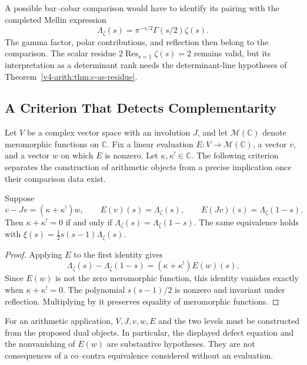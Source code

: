 A possible bar--cobar comparison would have to identify its pairing
with the completed Mellin expression
\[
 \Lambda_\zeta(s)=\pi^{-s/2}\Gamma(s/2)\zeta(s).
\]
The gamma factor, polar contributions, and reflection then belong to
the comparison. The scalar residue
\(2\operatorname{Res}_{s=1}\zeta(s)=2\) remains valid, but its
interpretation as a determinant rank needs the determinant-line
hypotheses of Theorem~\ref{v4-arith:thm:c-as-residue}.

\subsection{A Criterion That Detects Complementarity}

Let \(V\) be a complex vector space with an involution \(J\),
and let \(\mathscr M(\mathbb C)\) denote meromorphic functions on
\(\mathbb C\). Fix a linear evaluation
\(E:V\to\mathscr M(\mathbb C)\), a vector \(v\), and a vector
\(w\) on which \(E\) is nonzero. Let \(\kappa,\kappa^!\in\mathbb C\).
The following criterion separates the construction of arithmetic
objects from a precise implication once their comparison data exist.

\begin{theorem}
\label{v4-arith:thm:P1-resolution}
Suppose
\begin{equation}
 v-Jv=(\kappa+\kappa^!)w,
 \qquad
 E(v)(s)=\Lambda_\zeta(s),
 \qquad
 E(Jv)(s)=\Lambda_\zeta(1-s).
\end{equation}
Then \(\kappa+\kappa^!=0\) if and only if
\(\Lambda_\zeta(s)=\Lambda_\zeta(1-s)\).
The same equivalence holds with
\(\xi(s)=\tfrac12s(s-1)\Lambda_\zeta(s)\).
\end{theorem}
\begin{proof}
Applying \(E\) to the first identity gives
\[
 \Lambda_\zeta(s)-\Lambda_\zeta(1-s)
   =(\kappa+\kappa^!)E(w)(s).
\]
Since \(E(w)\) is not the zero meromorphic function, this identity
vanishes exactly when \(\kappa+\kappa^!=0\). The polynomial
\(s(s-1)/2\) is nonzero and invariant under reflection.
Multiplying by it preserves equality of meromorphic functions.
\end{proof}

For an arithmetic application, \(V,J,v,w,E\) and the two levels
must be constructed from the proposed dual objects. In particular,
the displayed defect equation and the nonvanishing of \(E(w)\)
are substantive hypotheses. They are not consequences of a
co--contra equivalence considered without an evaluation.

